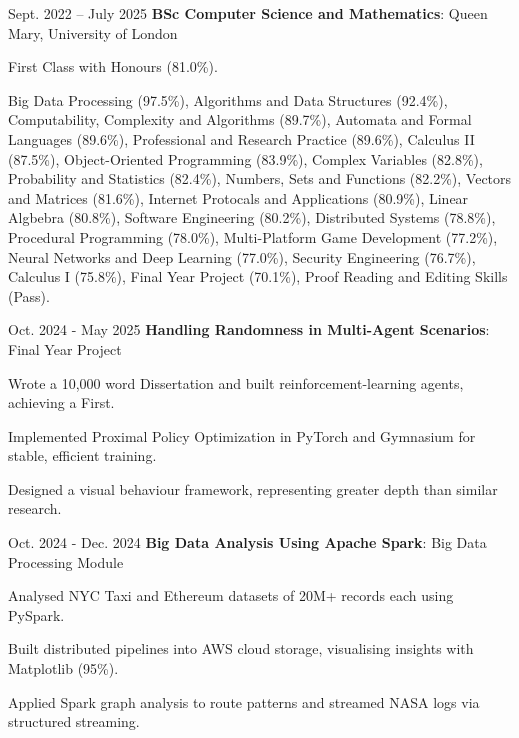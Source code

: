 \vspace{0.18cm}
    \begin{twocolentry}{
        Sept. 2022 – July 2025
    }
        \textbf{BSc Computer Science and Mathematics}: Queen Mary, University of London
    \end{twocolentry}
    \begin{highlights}
        \item First Class with Honours (81.0\%).
        \item Big Data Processing (97.5\%), Algorithms and Data Structures (92.4\%), Computability, Complexity and Algorithms (89.7\%), Automata and Formal Languages (89.6\%), Professional and Research Practice (89.6\%), Calculus II (87.5\%), Object-Oriented Programming (83.9\%), Complex Variables (82.8\%), Probability and Statistics (82.4\%), Numbers, Sets and Functions (82.2\%), Vectors and Matrices (81.6\%), Internet Protocals and Applications (80.9\%), Linear Algbebra (80.8\%), Software Engineering (80.2\%), Distributed Systems (78.8\%), Procedural Programming (78.0\%), Multi-Platform Game Development (77.2\%), Neural Networks and Deep Learning (77.0\%), Security Engineering (76.7\%), Calculus I (75.8\%), Final Year Project (70.1\%), Proof Reading and Editing Skills (Pass).
    \end{highlights}

    \vspace{0.18cm}
    \begin{twocolentry}{
        Oct. 2024 - May 2025
    }
        \textbf{Handling Randomness in Multi-Agent Scenarios}: Final Year Project
    \end{twocolentry}
    \begin{highlights}
          \item Wrote a 10,000 word Dissertation and built reinforcement-learning agents, achieving a First.
          \item Implemented Proximal Policy Optimization in PyTorch and Gymnasium for stable, efficient training.
          \item Designed a visual behaviour framework, representing greater depth than similar research.
      \end{highlights}

    \vspace{0.18cm}
    \begin{twocolentry}{
        Oct. 2024 - Dec. 2024
    }
        \textbf{Big Data Analysis Using Apache Spark}: Big Data Processing Module
    \end{twocolentry}
    \begin{highlights}
        \item Analysed NYC Taxi and Ethereum datasets of 20M+ records each using PySpark.
        \item Built distributed pipelines into AWS cloud storage, visualising insights with Matplotlib (95\%).
        \item Applied Spark graph analysis to route patterns and streamed NASA logs via structured streaming.
    \end{highlights}
    
